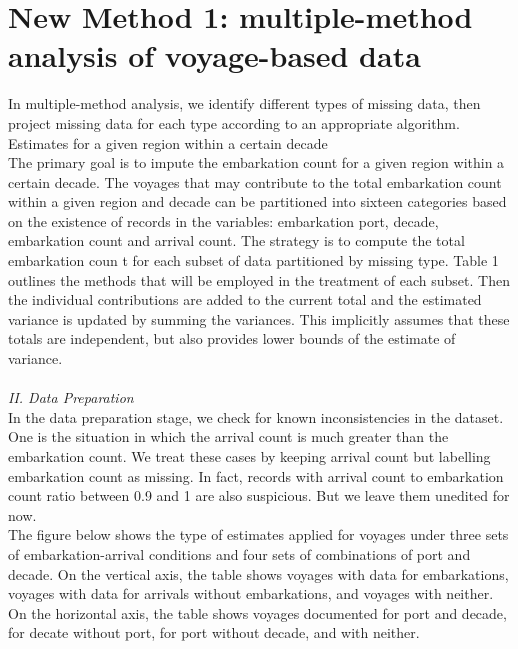 \documentclass{article}
\begin{document}
\section{New Method 1: multiple-method analysis of voyage-based data}

In multiple-method analysis, we identify different types of missing data, then project missing data for each type according to an appropriate algorithm. Estimates for a given region within a certain decade\\ 

The primary goal is to impute the embarkation count for a given region within a certain decade.
The voyages that may contribute to the total embarkation count within a given region and decade 
can be partitioned into sixteen categories based on the existence of records in the variables:
embarkation port, decade, embarkation count and arrival count. The strategy is to compute the total embarkation coun  t for each subset of data partitioned by missing type. Table 1 outlines the methods that will be employed in the treatment of each subset. Then the individual contributions are added to the current total and the estimated variance is updated by summing the variances. This implicitly assumes that these totals are independent, but also provides lower bounds of the estimate of variance. \\ 
\\
\textit{II. Data Preparation}\\
\indent
In the data preparation stage, we check for known inconsistencies  in the dataset.
One is the situation in which the arrival count is much greater than the embarkation count.
We treat these cases  by keeping arrival count  but labelling   embarkation count  as missing.
In fact, records with  arrival count  to embarkation count ratio between 0.9 and 1 are also
suspicious. But we leave them unedited for now.\\

\indent 
The figure below 
shows the type of estimates applied for voyages under three sets of embarkation-arrival conditions and four sets of combinations of port and decade. On the vertical axis, the table shows voyages with data for embarkations, voyages with data for arrivals without embarkations, and voyages with neither. On the horizontal axis, the table shows voyages documented for port and decade, for decate without port, for port without decade, and with neither.\\
\end{document}
